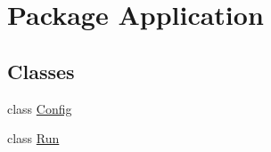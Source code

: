\hypertarget{namespace_application}{\section{Package Application}
\label{namespace_application}
}
\subsection*{Classes}
\begin{DoxyCompactItemize}
\item 
class \hyperlink{class_application_1_1_config}{Config}
\item 
class \hyperlink{class_application_1_1_run}{Run}
\end{DoxyCompactItemize}
